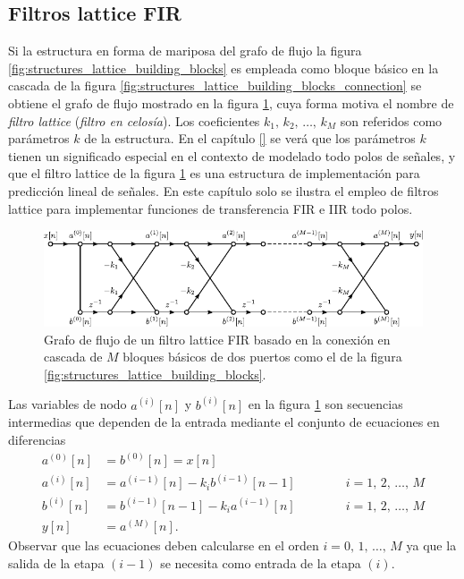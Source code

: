 \documentclass[a4paper]{report}
\begin{document}
\subsection{Filtros lattice FIR}\label{sec:structures_lattice_fir}

Si la estructura en forma de mariposa del grafo de flujo la figura \ref{fig:structures_lattice_building_blocks} es empleada como bloque básico en la cascada de la figura \ref{fig:structures_lattice_building_blocks_connection} se obtiene el grafo de flujo mostrado en la figura \ref{fig:structures_lattice_building_blocks_connection_fir}, cuya forma motiva el nombre de \emph{filtro lattice} (\emph{filtro en celosía}). Los coeficientes \(k_1,\,k_2,\,\dots,\, k_M\) son referidos como parámetros \(k\) de la estructura. En el capítulo \ref{} se verá que los parámetros \(k\) tienen un significado especial en el contexto de modelado todo polos de señales, y que el filtro lattice de la figura \ref{fig:structures_lattice_building_blocks_connection_fir} es una estructura de implementación para predicción lineal de señales. En este capítulo solo se ilustra el empleo de filtros lattice para implementar funciones de transferencia FIR e IIR todo polos.
\begin{figure}[!htb]
 \begin{center}
 \includegraphics[width=1\textwidth]{figuras/structures_lattice_building_blocks_connection_fir.pdf}
 \caption{\label{fig:structures_lattice_building_blocks_connection_fir} Grafo de flujo de un filtro lattice FIR basado en la conexión en cascada de \(M\) bloques básicos de dos puertos como el de la figura \ref{fig:structures_lattice_building_blocks}.}
 \end{center}
\end{figure}

Las variables de nodo \(a^{(i)}[n]\) y \(b^{(i)}[n]\) en la figura \ref{fig:structures_lattice_building_blocks_connection_fir} son secuencias intermedias que dependen de la entrada mediante el conjunto de ecuaciones en diferencias 
\begin{equation}\label{eq:structures_lattice_difference_equations_set_general}
 \begin{aligned}
  a^{(0)}[n]&=b^{(0)}[n]=x[n]\\
  a^{(i)}[n]&=a^{(i-1)}[n]-k_ib^{(i-1)}[n-1]
  \qquad\qquad i=1,\,2,\,\dots,\,M\\
  b^{(i)}[n]&=b^{(i-1)}[n-1]-k_ia^{(i-1)}[n]
  \qquad\qquad i=1,\,2,\,\dots,\,M\\
  y[n]&=a^{(M)}[n].
 \end{aligned}
\end{equation}
Observar que las ecuaciones deben calcularse en el orden \(i=0,\,1,\,\dots,\,M\) ya que  la salida de la etapa \((i-1)\) se necesita como entrada de la etapa \((i)\).
\end{document}

